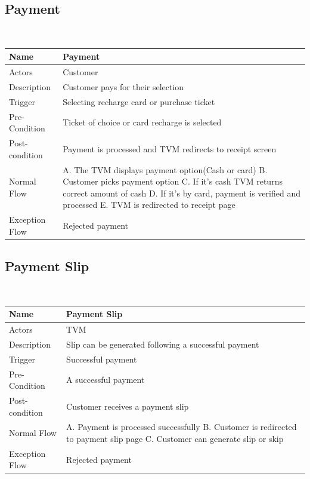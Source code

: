 \documentclass{article}
\begin{document}
{\subsection{Payment}
\hskip1cm\
\begin{tabular}{|p{3cm}|p{6cm}|}
    \hline
    Name & Payment\\
    \hline
    Actors & Customer\\
    \hline
    Description & Customer pays for their selection\\
    \hline
    Trigger & Selecting recharge card or purchase ticket\\
    \hline
    Pre-Condition & Ticket of choice or card recharge is selected \\
    \hline
    Post-condition & Payment is processed and TVM redirects to receipt screen\\
    \hline
    Normal Flow &
        A. The TVM displays payment option(Cash or card)\newline
        B. Customer picks payment option\newline
        C. If it’s cash TVM returns correct amount of cash\newline
        D. If it’s by card, payment is verified and processed \newline
        E. TVM is redirected to receipt page\\
    \hline
    Exception Flow & Rejected payment\\
    \hline
\end{tabular}
\subsection{Payment Slip}
\hskip1cm\
\begin{tabular}{|p{3cm}|p{6cm}|}
    \hline
    Name & Payment Slip\\
    \hline
    Actors & TVM\\
    \hline
    Description & Slip can be generated following a successful payment\\
    \hline
    Trigger & Successful payment\\
    \hline
    Pre-Condition & A successful payment\\
    \hline
    Post-condition & Customer receives a payment slip\\
    \hline
    Normal Flow &
        A. Payment is processed successfully\newline
        B. Customer is redirected to payment slip page\newline
        C. Customer can generate slip or skip\\
    \hline
    Exception Flow & Rejected payment\\
    \hline
\end{tabular}
}
\end{document}

